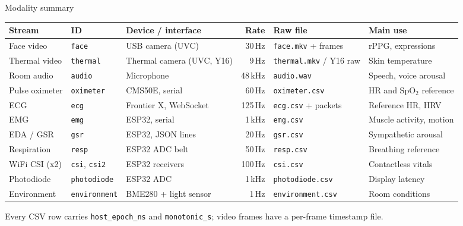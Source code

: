 \documentclass[aspectratio=169,11pt]{beamer}
\newcommand{\code}[1]{{\small\texttt{#1}}}
\begin{document}
\begin{frame}{Modality summary}
  \scriptsize
  \begin{tabularx}{\textwidth}{@{}l l l r l X@{}}
    \toprule
    \textbf{Stream} & \textbf{ID} & \textbf{Device / interface} & \textbf{Rate} & \textbf{Raw file} & \textbf{Main use} \\
    \midrule
    Face video & \code{face} & USB camera (UVC) & 30\,Hz & \code{face.mkv} + frames & rPPG, expressions \\
    Thermal video & \code{thermal} & Thermal camera (UVC, Y16) & 9\,Hz & \code{thermal.mkv} / Y16 raw & Skin temperature \\
    Room audio & \code{audio} & Microphone & 48\,kHz & \code{audio.wav} & Speech, voice arousal \\
    Pulse oximeter & \code{oximeter} & CMS50E, serial & 60\,Hz & \code{oximeter.csv} & HR and SpO$_2$ reference \\
    ECG & \code{ecg} & Frontier X, WebSocket & 125\,Hz & \code{ecg.csv} + packets & Reference HR, HRV \\
    EMG & \code{emg} & ESP32, serial & 1\,kHz & \code{emg.csv} & Muscle activity, motion \\
    EDA / GSR & \code{gsr} & ESP32, JSON lines & 20\,Hz & \code{gsr.csv} & Sympathetic arousal \\
    Respiration & \code{resp} & ESP32 ADC belt & 50\,Hz & \code{resp.csv} & Breathing reference \\
    WiFi CSI (x2) & \code{csi}, \code{csi2} & ESP32 receivers & 100\,Hz & \code{csi.csv} & Contactless vitals \\
    Photodiode & \code{photodiode} & ESP32 ADC & 1\,kHz & \code{photodiode.csv} & Display latency \\
    Environment & \code{environment} & BME280 + light sensor & 1\,Hz & \code{environment.csv} & Room conditions \\
    \bottomrule
  \end{tabularx}
  \vspace{0.4em}

  \footnotesize Every CSV row carries \code{host\_epoch\_ns} and \code{monotonic\_s}; video frames have a per-frame timestamp file.
\end{frame}
\end{document}
